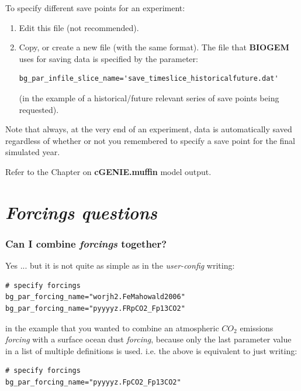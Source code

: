 \documentclass[11pt,fleqn]{book} %
\begin{document}
To specify different save points for an experiment:
\begin{enumerate}[noitemsep]
\setlength{\itemindent}{.2in}
\item Edit this file (not recommended).
\item Copy, or create a new file (with the same format). The file that \textbf{BIOGEM} uses for saving data is specified by the parameter:
\small\begin{verbatim}
bg_par_infile_slice_name='save_timeslice_historicalfuture.dat'
\end{verbatim}\normalsize
(in the example of a historical/future relevant series of save points being requested).
\end{enumerate}

Note that always, at the very end of an experiment, data is automatically saved regardless of whether or not you remembered to specify a save point for the final simulated year.

Refer to the Chapter on \textbf{cGENIE.muffin} model output.


\newpage


\section{\textit{Forcings questions}}

%
\subsubsection{Can I combine \textit{forcings} together?}

Yes ... but it is not quite as simple as in the \textit{user-config} writing:
\small\begin{verbatim}
# specify forcings
bg_par_forcing_name="worjh2.FeMahowald2006"
bg_par_forcing_name="pyyyyz.FRpCO2_Fp13CO2"
\end{verbatim}\normalsize
in the example that you wanted to combine an atmospheric \(CO_{2}\) emissions \textit{forcing} with a surface ocean dust \textit{forcing}, because only the last parameter value in a list of multiple definitions is used. i.e. the above is equivalent to just writing:
\small\begin{verbatim}
# specify forcings
bg_par_forcing_name="pyyyyz.FpCO2_Fp13CO2"
\end{verbatim}\normalsize
\end{document}
